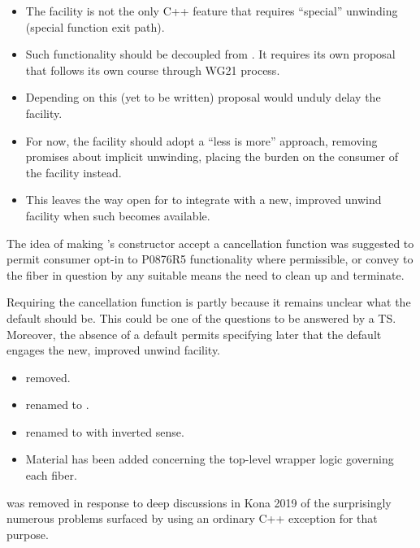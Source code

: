 \begin{itemize}
    \item The  facility is not the only C++ feature that
          requires ``special'' unwinding (special function exit path).
    \item Such functionality should be decoupled from \fiber. It requires its
          own proposal that follows its own course through WG21 process.
    \item Depending on this (yet to be written) proposal would unduly delay
          the  facility.
    \item For now, the  facility should adopt a ``less is
          more'' approach, removing promises about implicit unwinding, placing
          the burden on the consumer of the facility instead.
    \item This leaves the way open for  to integrate with
          a new, improved unwind facility when such becomes available.
\end{itemize}

The idea of making \fiber's constructor accept a cancellation function was
suggested to permit consumer opt-in to P0876R5 functionality where
permissible, or convey to the fiber in question by any suitable means the need
to clean up and terminate.

Requiring the cancellation function is partly because it remains unclear what
the default should be. This could be one of the questions to be answered by a
TS. Moreover, the absence of a default permits specifying later that the
default engages the new, improved unwind facility.


\begin{itemize}
    \item {} removed.
    \item {} renamed to
      \canxtresume.
    \item {} renamed to  with inverted
      sense.
    \item Material has been added concerning the top-level wrapper
      logic governing each fiber.
\end{itemize}

\unwindex was removed in response to deep
discussions in Kona 2019 of the surprisingly numerous problems surfaced by
using an ordinary C++ exception for that purpose.


